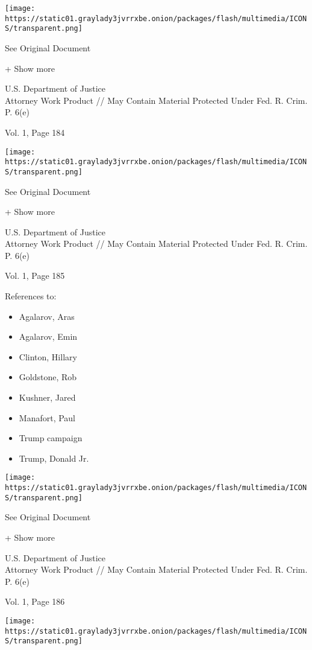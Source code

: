 \protect\hyperlink{}{}

\texttt{[image: https://static01.graylady3jvrrxbe.onion/packages/flash/multimedia/ICONS/transparent.png]}

See Original Document

+ Show more

U.S. Department of Justice\\
Attorney Work Product // May Contain Material Protected Under Fed. R.
Crim. P. 6(e)

Vol. 1, Page 184

\protect\hyperlink{}{}

\texttt{[image: https://static01.graylady3jvrrxbe.onion/packages/flash/multimedia/ICONS/transparent.png]}

See Original Document

+ Show more

U.S. Department of Justice\\
Attorney Work Product // May Contain Material Protected Under Fed. R.
Crim. P. 6(e)

Vol. 1, Page 185

References to:

\begin{itemize}
\tightlist
\item
  Agalarov, Aras
\item
  Agalarov, Emin
\item
  Clinton, Hillary
\item
  Goldstone, Rob
\item
  Kushner, Jared
\item
  Manafort, Paul 
\item
  Trump campaign
\item
  Trump, Donald Jr.
\end{itemize}

\protect\hyperlink{}{}

\texttt{[image: https://static01.graylady3jvrrxbe.onion/packages/flash/multimedia/ICONS/transparent.png]}

See Original Document

+ Show more

U.S. Department of Justice\\
Attorney Work Product // May Contain Material Protected Under Fed. R.
Crim. P. 6(e)

Vol. 1, Page 186

\protect\hyperlink{}{}

\texttt{[image: https://static01.graylady3jvrrxbe.onion/packages/flash/multimedia/ICONS/transparent.png]}

